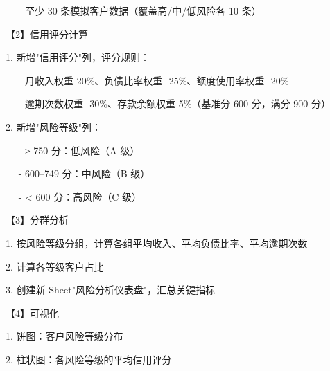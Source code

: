 \documentclass[
  american,
  chinese,
]{ctexart}
\begin{document}
\foreignlanguage{american}{{~~ }- }{至少}\foreignlanguage{american}{ 30 }{条模拟客户数据（覆盖高/中/低风险各}\foreignlanguage{american}{ 10 }{条）}\foreignlanguage{american}{}

{【}\foreignlanguage{american}{2}{】信用评分计算}\foreignlanguage{american}{}

\foreignlanguage{american}{1. }{新增}{"}{信用评分}{"}{列，评分规则：}\foreignlanguage{american}{}

\foreignlanguage{american}{{~~ }- }{月收入权重}\foreignlanguage{american}{ 20\%}{、负债比率权重}\foreignlanguage{american}{ -25\%}{、额度使用率权重}\foreignlanguage{american}{ -20\%}\foreignlanguage{american}{}

\foreignlanguage{american}{{~~ }- }{逾期次数权重}\foreignlanguage{american}{ -30\%}{、存款余额权重}\foreignlanguage{american}{ 5\%}{（基准分}\foreignlanguage{american}{ 600 }{分，满分}\foreignlanguage{american}{ 900 }{分）}\foreignlanguage{american}{}

\foreignlanguage{american}{2. }{新增}{"}{风险等级}{"}{列：}\foreignlanguage{american}{}

\foreignlanguage{american}{{~~ }- }{≥}\foreignlanguage{american}{ 750 }{分：低风险（}\foreignlanguage{american}{A }{级）}\foreignlanguage{american}{}

\foreignlanguage{american}{{~~ }- 600--749 }{分：中风险（}\foreignlanguage{american}{B }{级）}\foreignlanguage{american}{}

\foreignlanguage{american}{{~~ }- < 600 }{分：高风险（}\foreignlanguage{american}{C }{级）}\foreignlanguage{american}{}

{【}\foreignlanguage{american}{3}{】分群分析}\foreignlanguage{american}{}

\foreignlanguage{american}{1. }{按风险等级分组，计算各组平均收入、平均负债比率、平均逾期次数}\foreignlanguage{american}{}

\foreignlanguage{american}{2. }{计算各等级客户占比}\foreignlanguage{american}{}

\foreignlanguage{american}{3. }{创建新}\foreignlanguage{american}{ Sheet"}{风险分析仪表盘}{"}{，汇总关键指标}\foreignlanguage{american}{}

{【}\foreignlanguage{american}{4}{】可视化}\foreignlanguage{american}{}

\foreignlanguage{american}{1. }{饼图：客户风险等级分布}\foreignlanguage{american}{}

\foreignlanguage{american}{2. }{柱状图：各风险等级的平均信用评分}\foreignlanguage{american}{}
\end{document}
